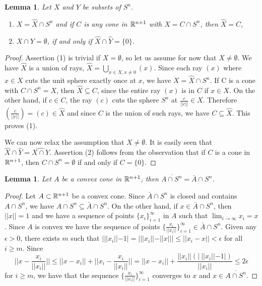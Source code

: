 \documentclass[psamsfonts]{amsart}
\numberwithin{equation}{subsection}
\theoremstyle{plain}
\newtheorem{lemma}[theorem]{Lemma}
\theoremstyle{definition}
\theoremstyle{remark}
\begin{document}
\begin{lemma} \label{hatcone} Let $X$ and $Y$ be subsets of $S^n$.
\begin{enumerate}
\item $X = \widehat{X} \cap S^n$ and   if 
$C$ is any cone  in $\Bbb{R}^{n + 1}$ with $X = C\cap S^n$, then $\widehat{X} = C$,
\item  $X\cap Y = \emptyset$, if and only if  $\widehat{X} \cap \widehat{Y} = \{0\}$.
\end{enumerate}
\end{lemma}
\begin{proof} Assertion (1) is trivial if $X = \emptyset$, so let us assume for now that  $X \not= \emptyset$. 
We have $\widehat{X}$ is a union of rays,  $\widehat{X} = \bigcup_{x \in X, x \not= 0} (x)$. Since each ray $(x)$ where 
$x \in X$ 
cuts the unit sphere exactly once  at $x$, we have $X = \widehat{X} \cap S^n$. If C is a cone with $C \cap S^n = X$, then 
$\widehat{X} \subseteq C$, since the entire  ray $(x)$ is in $C$ if $x \in X$. On the other hand, if $c \in C$, the ray $(c)$ cuts 
the sphere $S^n$ at $\frac{c}{||c||} \in X$. Therefore $(\frac{c}{||c||}) = (c) \in \widehat{X}$ and since $C$ is the union of such rays, we have $C \subseteq \widehat{X}$. This proves (1).

We can now relax the assumption that $X \not= \emptyset$. 
It is easily seen that  $\widehat{X} \cap \widehat{Y} = \widehat{X \cap Y}$. Assertion (2) follows from the observation that 
if $C$ is a cone in  $\Bbb{R}^{n + 1}$, then $C \cap S^n = \emptyset$ if and only if $C = \{0\}$. 
\end{proof}

\begin{lemma} \label{cone} Let $A$ be a convex cone in $\Bbb{R}^{n + 1}$, then $\overline{A \cap S^{n} } = \bar{A} \cap S^n$.
\end{lemma}
\begin{proof}
Let   $A \subset \Bbb{R}^{n + 1}$ be a convex cone.  Since 
$ \bar{A} \cap S^n$ is closed and contains $A \cap S^{n}$, we have $\overline{A \cap S^{n} } \subseteq  \bar{A} \cap S^n$. On the other hand, if $x \in \bar{A} \cap S^n$, then $||x|| = 1$ and we have a sequence of points $\{x_i\}_{i = 1}^{\infty}$ in $A$ such that
$\lim_{i \to \infty}x_i = x$. Since $A$ is convex we have the sequence of points $\{\frac{x_i}{||x_i||}\}_{i = 1}^{\infty} \in  \bar{A} \cap S^n$. 
Given any $\epsilon > 0$, there exists $m$ such that  $| ||x_i|| - 1 | = | ||x_i|| - ||x|| | \leq   ||x_i - x|| < \epsilon $ for all $i \geq m$.
Since 
$$||x - \frac{x_i}{||x_i||}|| \leq ||x - x_i|| + ||x_i -  \frac{x_i}{||x_i||}|| = ||x - x_i|| + \frac{||x_i||(| \ ||x_i||  -  1|)}{||x_i||} \leq 2\epsilon$$
for $i \geq m$, we have that the sequence $\{\frac{x_i}{||x_i||}\}_{i = 1}^{\infty}$ converges to $x$ and $x \in \overline{A \cap S^{n} }$. 
\end{proof}
\end{document}
